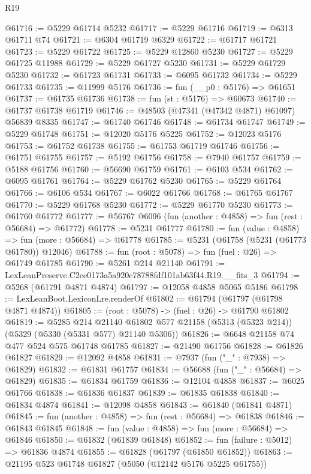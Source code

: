 \begin{lexlean}{R19}
\begin{coremodule}
@61716 := @5229 @61714 @5232
@61717 := @5229 @61716
@61719 := @6313 @61711 @74
@61721 := @6304 @61719 @6329
@61722 := @61717 @61721
@61723 := @5229 @61722
@61725 := @5229 @12860 @5230
@61727 := @5229 @61725 @11988
@61729 := @5229 @61727 @5230
@61731 := @5229 @61729 @5230
@61732 := @61723 @61731
@61733 := @6095 @61732
@61734 := @5229 @61733
@61735 := @11999 @5176
@61736 := fun (__p0 : @5176) => @61651
@61737 := @61735 @61736
@61738 := fun (st : @5176) => @60673
@61740 := @61737 @61738 @61719
@61746 := @48503 (@47341 (@47342 @4871) @61097) @56839 @8335
@61747 := @61740 @61746
@61748 := @61734 @61747
@61749 := @5229 @61748
@61751 := @12020 @5176 @5225
@61752 := @12023 @5176
@61753 := @61752 @61738
@61755 := @61753 @61719 @61746
@61756 := @61751 @61755
@61757 := @5192 @61756
@61758 := @7940 @61757
@61759 := @5188 @61756
@61760 := @56690 @61759
@61761 := @6103 @534
@61762 := @6095 @61761
@61764 := @5229 @61762 @5230
@61765 := @5229 @61764
@61766 := @6106 @534
@61767 := @6022 @61766
@61768 := @61765 @61767
@61770 := @5229 @61768 @5230
@61772 := @5229 @61770 @5230
@61773 := @61760 @61772
@61777 := @56767 @6096 (fun (another : @4858) => fun (rest : @56684) => @61772)
@61778 := @5231 @61777
@61780 := fun (value : @4858) => fun (more : @56684) => @61778
@61785 := @5231 (@61758 (@5231 (@61773 @61780)) @12046)
@61788 := fun (root : @5078) => fun (fuel : @26) => @61749 @61785
@61790 := @5261 @214 @21140
@61791 := LexLeanPreserve.C2ee0173a5a920c78788fdf101ab63f44.R19.__fits_3
@61794 := @5268 (@61791 @4871 @4874)
@61797 := @12058 @4858 @5065 @5186
@61798 := LexLeanBoot.LexiconLre.renderOf
@61802 := @61794 (@61797 (@61798 @4871 @4874))
@61805 := (root : @5078) -> (fuel : @26) -> @61790 @61802
@61819 := @5285
    @214
    @21140
    @61802
    @577
    @21158
    (@5313 (@5323 @214))
    (@5329 (@5330 (@5331 @577) @21140 @5306))
@61826 := @6648 @21158 @74 @477 @524 @575 @61748 @61785
@61827 := @21490 @61756
@61828 := @61826 @61827
@61829 := @12092 @4858
@61831 := @7937 (fun ("_" : @7938) => @61829)
@61832 := @61831 @61757
@61834 := @56688 (fun ("_" : @56684) => @61829)
@61835 := @61834 @61759
@61836 := @12104 @4858
@61837 := @6025 @61766
@61838 := @61836 @61837
@61839 := @61835 @61838
@61840 := @61834 @4874
@61841 := @12098 @4858
@61843 := @61840 (@61841 @4871)
@61845 := fun (another : @4858) => fun (rest : @56684) => @61838
@61846 := @61843 @61845
@61848 := fun (value : @4858) => fun (more : @56684) => @61846
@61850 := @61832 (@61839 @61848)
@61852 := fun (failure : @5012) => @61836 @4874
@61855 := @61828 (@61797 (@61850 @61852))
@61863 := @21195 @523 @61748 @61827 (@5050 (@12142 @5176 @5225 @61755))

\end{coremodule}
\end{lexlean}
